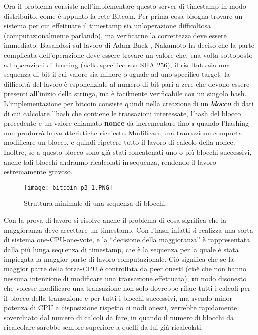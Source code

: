 Ora il problema consiste nell'implementare questo server di timestamp in modo distribuito, come è appunto la rete Bitcoin. Per prima cosa bisogna trovare un sistema per cui effettuare il timestamp sia un'operazione difficoltosa (computazionalmente parlando), ma verificarne la correttezza deve essere immediato. Basandosi sul lavoro di Adam Back \cite{hashcash}, Nakamoto ha deciso che la parte complicata dell'operazione deve essere trovare un valore che, una volta sottoposto ad operazioni di hashing (nello specifico con SHA-256), il risultato sia una sequenza di bit il cui valore sia minore o uguale ad uno specifico target: la difficoltà del lavoro è esponenziale al numero di bit pari a zero che devono essere presenti all'inizio della stringa, ma è facilmente verificabile con un singolo hash. L'implementazione per bitcoin consiste quindi nella creazione di un \emph{\textbf{blocco}} di dati di cui calcolare l'hash che contiene le transazioni interessate, l'hash del blocco precedente e un valore chiamato \textbf{nonce} da incrementare fino a quando l'hashing non produrrà le caratteristiche richieste. Modificare una transazione comporta modificare un blocco, e quindi ripetere tutto il lavoro di calcolo della nonce. Inoltre, se a questo blocco sono già stati concatenati uno o più blocchi successivi, anche tali blocchi andranno ricalcolati in sequenza, rendendo il lavoro estremamente gravoso.

\begin{figure}[htbp]
\centering
\texttt{[image: bitcoin\_p3\_1.PNG]}
\caption[Blockchain minimale]{Struttura minimale di una sequenza di blocchi.\label{bitcoin_p3_1}}
\end{figure}

Con la prova di lavoro si risolve anche il problema di cosa significa che la maggioranza deve accettare un timestamp. Con l'hash infatti si realizza una sorta di sistema one-CPU-one-vote, e la ``decisione della maggioranza'' è rappresentata dalla più lunga sequenza di timestamp, che è la sequenza per la quale è stata impiegata la maggior parte di lavoro computazionale. Ciò significa che se la maggior parte della forza-CPU è controllata da peer onesti (cioè che non hanno nessuna intenzione di modificare una transazione effettuata), un nodo disonesto che volesse modificare una transazione non solo dovrebbe rifare tutti i calcoli per il blocco della transazione e per tutti i blocchi successivi, ma avendo minor potenza di CPU a disposizione rispetto ai nodi onesti, verrebbe rapidamente soverchiato dal numero di calcoli da fare, in quando il numero di blocchi da ricalcolare sarebbe sempre superiore a quelli da lui già ricalcolati.\\

